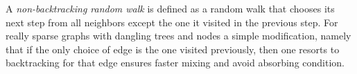 \documentclass{article} %
\begin{document}


A \emph{non-backtracking random walk} is defined as a random walk that chooses its next step from all neighbors except the one it visited in the previous step. For really sparse graphs with dangling trees and nodes a simple modification, namely that if the only choice of edge is the one visited previously, then one resorts to backtracking for that edge ensures faster mixing and avoid absorbing condition.  

\end{document}
